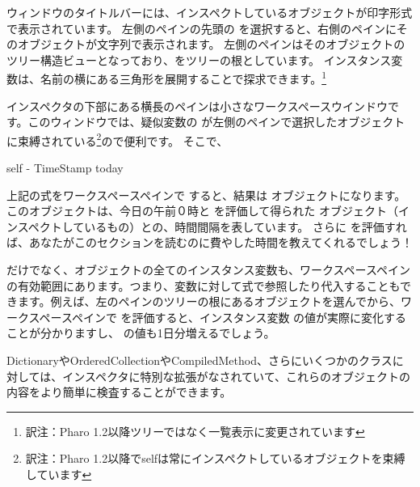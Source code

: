\documentclass[a4paper,10pt,twoside]{book}
\begin{document}
ウィンドウのタイトルバーには、インスペクトしているオブジェクトが印字形式で表示されています。
左側のペインの先頭の  を選択すると、右側のペインにそのオブジェクトが文字列で表示されます。
左側のペインはそのオブジェクトのツリー構造ビューとなっており、\self をツリーの根としています。
インスタンス変数は、名前の横にある三角形を展開することで探求できます。\footnote{訳注：Pharo 1.2以降ツリーではなく一覧表示に変更されています}

インスペクタの下部にある横長のペインは小さなワークスペースウインドウです。このウィンドウでは、疑似変数の  が左側のペインで選択したオブジェクトに束縛されている\footnote{訳注：Pharo 1.2以降でselfは常にインスペクトしているオブジェクトを束縛しています}ので便利です。
そこで、
\begin{code}{}
self - TimeStamp today
\end{code}
上記の式をワークスペースペインで  すると、結果は  オブジェクトになります。このオブジェクトは、今日の午前０時と  を評価して得られた  オブジェクト（インスペクトしているもの）との、時間間隔を表しています。
さらに  を評価すれば、あなたがこのセクションを読むのに費やした時間を教えてくれるでしょう！

 だけでなく、オブジェクトの全てのインスタンス変数も、ワークスペースペインの有効範囲にあります。つまり、変数に対して式で参照したり代入することもできます。例えば、左のペインのツリーの根にあるオブジェクトを選んでから、ワークスペースペインで  を評価すると、インスタンス変数  の値が実際に変化することが分かりますし、 の値も1日分増えるでしょう。


DictionaryやOrderedCollectionやCompiledMethod、さらにいくつかのクラスに対しては、インスペクタに特別な拡張がなされていて、これらのオブジェクトの内容をより簡単に検査することができます。

\end{document}
